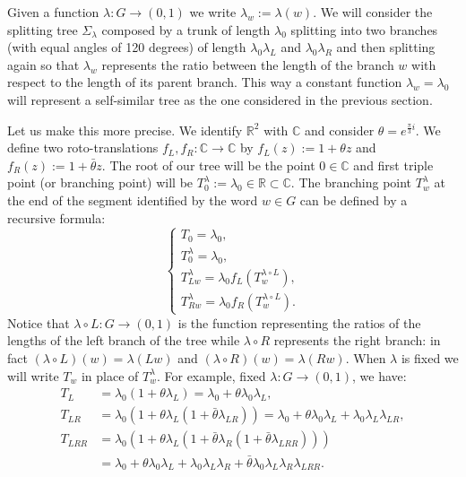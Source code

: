 \documentclass{amsart}
\newcommand{\RR}{\mathbb R}
\newcommand{\CC}{\mathbb C}
\theoremstyle{definition}
\theoremstyle{remark}
\begin{document}
Given a function $\mathbb \lambda\colon G\to (0,1)$ we write $\lambda_w:=\lambda(w)$.
We will consider the splitting tree $\Sigma_\lambda$ composed by a trunk of length $\lambda_0$ splitting 
into two branches (with equal angles of 120 degrees) of length $\lambda_0\lambda_L$ and $\lambda_0\lambda_R$
and then splitting again so that $\lambda_w$ represents the ratio between the length of the branch $w$ with respect 
to the length of its parent branch. 
This way a constant function $\lambda_w = \lambda_0$ will represent a self-similar tree as the one considered in the previous section.

Let us make this more precise.
We identify $\RR^2$ with $\CC$ and consider $\theta=e^{\frac{\pi}{3}i}$.
We define two roto-translations $f_L,f_R\colon \CC\to \CC$ by $f_L(z):= 1+\theta z$ and $f_R(z):=1+\bar\theta z$.
The root of our tree will be the point $0\in \CC$ and first triple point (or branching point) will be 
$T_0^\lambda:=\lambda_0\in \RR\subset \CC$. 
The branching point $T_w^\lambda$ at the end of the segment identified by the word $w\in G$ can be defined by a recursive formula:
\[
   \begin{cases}
    T_0 = \lambda_0, \\
    T_0^\lambda = \lambda_0, \\
    T_{Lw}^\lambda = \lambda_0 f_L(T_w^{\lambda\circ L}), \\
    T_{Rw}^\lambda = \lambda_0 f_R(T_w^{\lambda\circ L}).
   \end{cases}
\]
Notice that $\lambda\circ L\colon G \to (0,1)$ is the function representing the ratios of the lengths of the left branch of the tree 
while $\lambda\circ R$ represents the right branch: 
in fact $(\lambda\circ L)(w) = \lambda(Lw)$ and $(\lambda\circ R)(w) = \lambda(Rw)$.
When $\lambda$ is fixed we will write $T_w$ in place of $T_w^\lambda$.
For example, fixed $\lambda\colon G\to(0,1)$, we have: 
\begin{align*}
  T_L &= \lambda_0 (1+\theta \lambda_L) = \lambda_0+\theta \lambda_0\lambda_L,\\
  T_{LR} &= \lambda_0(1+\theta\lambda_L(1+\bar \theta\lambda_{LR})) 
    = \lambda_0 + \theta \lambda_0\lambda_L + \lambda_0\lambda_L\lambda_{LR},\\
  T_{LRR} &= \lambda_0 (1+ \theta \lambda_L(1+\bar \theta \lambda_R(1+\bar \theta \lambda_{LRR}))) \\
    &= \lambda_0 + \theta \lambda_0\lambda_L + \lambda_0\lambda_L\lambda_R + \bar\theta \lambda_0\lambda_L\lambda_R\lambda_{LRR}.
\end{align*}
\end{document}
